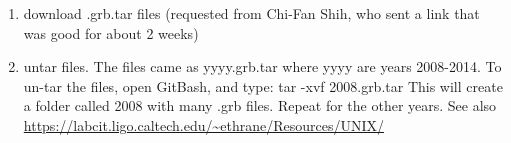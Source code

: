 \begin{enumerate}
\item download .grb.tar files (requested from Chi-Fan Shih, who sent a link that was good for about 2 weeks)

\item untar files. The files came as yyyy.grb.tar where yyyy are years 2008-2014. To un-tar the files, open GitBash, and type: tar -xvf 2008.grb.tar This will create a folder called 2008 with many .grb files. Repeat for the other years. See also \url{https://labcit.ligo.caltech.edu/~ethrane/Resources/UNIX/}






\end{enumerate}
